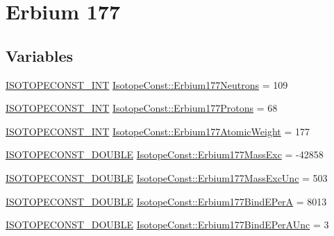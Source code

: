 \hypertarget{group___isotope_const-_erbium-_er177}{}\section{Erbium 177}
\label{group___isotope_const-_erbium-_er177}
\subsection*{Variables}
\begin{DoxyCompactItemize}
\item 
\mbox{\hyperlink{group___isotope_const-_macros_ga5f18360b3e99483a35c32d789e62621c}{I\+S\+O\+T\+O\+P\+E\+C\+O\+N\+S\+T\+\_\+\+I\+NT}} \mbox{\hyperlink{group___isotope_const-_erbium-_er177_gac9e825fd21dbd730bdd1b11b5cf5d046}{Isotope\+Const\+::\+Erbium177\+Neutrons}} = 109
\item 
\mbox{\hyperlink{group___isotope_const-_macros_ga5f18360b3e99483a35c32d789e62621c}{I\+S\+O\+T\+O\+P\+E\+C\+O\+N\+S\+T\+\_\+\+I\+NT}} \mbox{\hyperlink{group___isotope_const-_erbium-_er177_ga8d369516cf9c354ab389934826c39a23}{Isotope\+Const\+::\+Erbium177\+Protons}} = 68
\item 
\mbox{\hyperlink{group___isotope_const-_macros_ga5f18360b3e99483a35c32d789e62621c}{I\+S\+O\+T\+O\+P\+E\+C\+O\+N\+S\+T\+\_\+\+I\+NT}} \mbox{\hyperlink{group___isotope_const-_erbium-_er177_ga41431407c786783d104d470bad99573b}{Isotope\+Const\+::\+Erbium177\+Atomic\+Weight}} = 177
\item 
\mbox{\hyperlink{group___isotope_const-_macros_ga8f45a7272ce02c0b4c65c44636ed719a}{I\+S\+O\+T\+O\+P\+E\+C\+O\+N\+S\+T\+\_\+\+D\+O\+U\+B\+LE}} \mbox{\hyperlink{group___isotope_const-_erbium-_er177_ga36d38e264f9d42529e1320ca438838f5}{Isotope\+Const\+::\+Erbium177\+Mass\+Exc}} = -\/42858
\item 
\mbox{\hyperlink{group___isotope_const-_macros_ga8f45a7272ce02c0b4c65c44636ed719a}{I\+S\+O\+T\+O\+P\+E\+C\+O\+N\+S\+T\+\_\+\+D\+O\+U\+B\+LE}} \mbox{\hyperlink{group___isotope_const-_erbium-_er177_gae920838d21264c39d6f92ec2ce8546b7}{Isotope\+Const\+::\+Erbium177\+Mass\+Exc\+Unc}} = 503
\item 
\mbox{\hyperlink{group___isotope_const-_macros_ga8f45a7272ce02c0b4c65c44636ed719a}{I\+S\+O\+T\+O\+P\+E\+C\+O\+N\+S\+T\+\_\+\+D\+O\+U\+B\+LE}} \mbox{\hyperlink{group___isotope_const-_erbium-_er177_gaaa1c0bd50a3772d1923be9f006e6420d}{Isotope\+Const\+::\+Erbium177\+Bind\+E\+PerA}} = 8013
\item 
\mbox{\hyperlink{group___isotope_const-_macros_ga8f45a7272ce02c0b4c65c44636ed719a}{I\+S\+O\+T\+O\+P\+E\+C\+O\+N\+S\+T\+\_\+\+D\+O\+U\+B\+LE}} \mbox{\hyperlink{group___isotope_const-_erbium-_er177_ga15fbdd19144c300b1980acf41b7fb133}{Isotope\+Const\+::\+Erbium177\+Bind\+E\+Per\+A\+Unc}} = 3

\end{DoxyCompactItemize}
